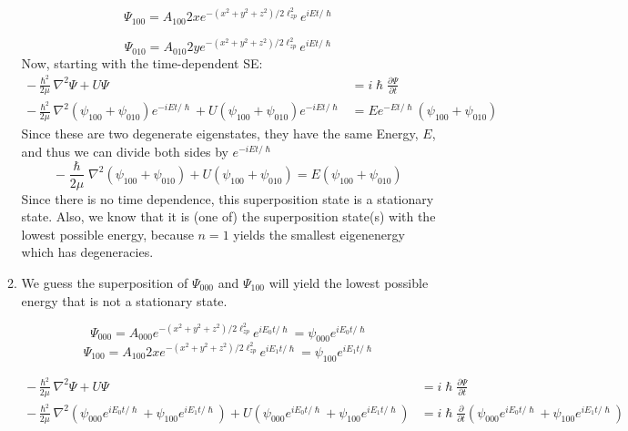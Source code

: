 \documentclass[10pt]{article}
\begin{document}
\begin{enumerate}
\begin{enumerate}
      \begin{equation*}
        \Psi_{100} = A_{100} 2x e ^ {- \left( x^2+y^2+z^2 \right)/2\ell_{zp}^2}e ^ {iEt / \hslash}
      \end{equation*}
      
      \begin{equation*}
        \Psi_{010} = A_{010} 2y e ^ {- \left( x^2+y^2+z^2 \right)/2\ell_{zp}^2}e ^ {iEt / \hslash}
      \end{equation*}
      Now, starting with the time-dependent SE:
      \begin{align*}
        -\frac{\hslash^2}{2\mu} \nabla ^2 \Psi + U\Psi &= i \hslash \frac{\partial \Psi}{\partial t} \\
        -\frac{\hslash^2}{2\mu} \nabla ^2 \left( \psi_{100} + \psi_{010} \right) e ^ {-iEt/\hslash}+ U \left( \psi_{100} + \psi_{010} \right) e ^ {-iEt / \hslash}&= E e ^ {-Et / \hslash}\left( \psi_{100} + \psi_{010} \right)
      \end{align*}
      Since these are two degenerate eigenstates, they have the same Energy, $ E $, and thus we can divide both sides by $ e ^ {-iEt /\hslash} $
      \begin{equation*}
        -\frac{\hslash}{2 \mu} \nabla^2 \left( \psi_{100} + \psi_{010} \right) + U \left( \psi_{100} + \psi_{010} \right) = E \left( \psi_{100} + \psi_{010} \right)
      \end{equation*}
      Since there is no time dependence, this superposition state is a stationary state.
      Also, we know that it is (one of) the superposition state(s) with the lowest possible energy, because $ n=1 $ yields the smallest eigenenergy which has degeneracies.
    \item We guess the superposition of $ \Psi_{000} $ and $ \Psi_{100} $ will yield the lowest possible energy that is not a stationary state.

      \begin{equation*}
        \Psi_{000} = A_{000} e ^ {- \left( x^2+y^2+z^2 \right)/2\ell_{zp}^2}e ^ {iE_0t / \hslash} = \psi_{000} e ^ {i E_0 t / \hslash}
      \end{equation*}
      \begin{equation*}
        \Psi_{100} = A_{100} 2x e ^ {- \left( x^2+y^2+z^2 \right)/2\ell_{zp}^2}e ^ {iE_1t / \hslash} = \psi_{100} e ^ {iE_1t / \hslash}
      \end{equation*}

      \begin{align*}
        -\frac{\hslash^2}{2\mu} \nabla ^2 \Psi + U\Psi &= i \hslash \frac{\partial \Psi}{\partial t} \\
        -\frac{\hslash^2}{2\mu} \nabla ^2 \left( \psi_{000} e ^ {i E_0 t / \hslash} + \psi_{100} e ^ {iE_1t / \hslash} \right) + U\left( \psi_{000} e ^ {i E_0 t / \hslash} + \psi_{100} e ^ {iE_1t / \hslash} \right) &= i \hslash \frac{\partial }{\partial t} \left( \psi_{000} e ^ {i E_0 t / \hslash} + \psi_{100} e ^ {iE_1t / \hslash} \right)
      \end{align*}


\end{enumerate}
\end{enumerate}
\end{document}
